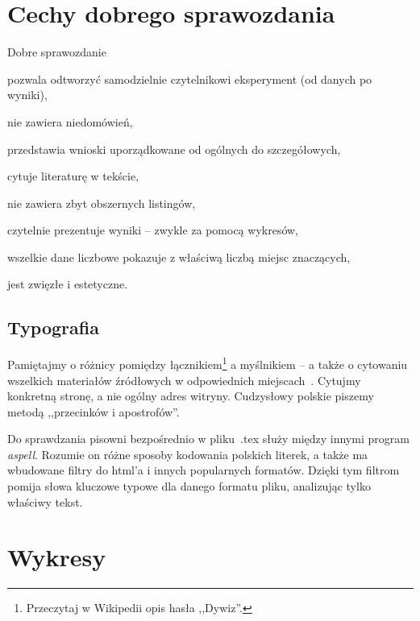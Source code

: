 \documentclass{article}
\begin{document}
\section{Cechy dobrego sprawozdania}

Dobre sprawozdanie
\begin{tightlist}
\item pozwala odtworzyć samodzielnie czytelnikowi eksperyment (od danych po wyniki),
\item nie zawiera niedomówień,
\item przedstawia wnioski uporządkowane od ogólnych do szczegółowych,
\item cytuje literaturę w tekście,
\item nie zawiera zbyt obszernych listingów,
\item czytelnie prezentuje wyniki -- zwykle za pomocą wykresów,
\item wszelkie dane liczbowe pokazuje z właściwą liczbą miejsc znaczących,
\item jest zwięzłe i estetyczne.
\end{tightlist}

\subsection{Typografia}
\label{sec:typografia}

Pamiętajmy o różnicy pomiędzy łącznikiem\footnote{Przeczytaj w Wikipedii opis hasła ,,Dywiz''.} a myślnikiem -- a także o cytowaniu wszelkich materiałów źródłowych w odpowiednich miejscach~\cite{WikiDash}. Cytujmy konkretną stronę, a nie ogólny adres witryny. Cudzysłowy polskie piszemy metodą ,,przecinków i apostrofów''.

Do sprawdzania pisowni bezpośrednio w pliku\ .tex służy między innymi program \emph{aspell}. Rozumie on różne sposoby kodowania polskich literek, a także ma wbudowane filtry do html'a i innych popularnych formatów. Dzięki tym filtrom pomija słowa kluczowe typowe dla danego formatu pliku, analizując tylko właściwy tekst. %







\section{Wykresy}
\end{document}
